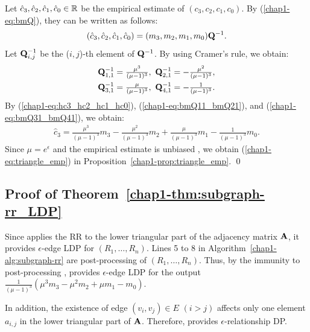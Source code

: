 {Let $\hat{c}_3, \hat{c}_2, \hat{c}_1, \hat{c}_0 \in \mathbb{R}$ be the empirical estimate of $(c_3, c_2, c_1, c_0)$. 
By (\ref{chap1-eq:bmQ}), they can be written as follows:
\begin{align}
(\hat{c}_3, \hat{c}_2, \hat{c}_1, \hat{c}_0) = (m_3, m_2, m_1, m_0) \mathbf{Q}^{-1}.
\label{chap1-eq:hc3_hc2_hc1_hc0}
\end{align}
Let $\mathbf{Q}_{i,j}^{-1}$ be the ($i,j$)-th element of $\mathbf{Q}^{-1}$. 
By using Cramer's rule, we obtain: 
\begin{align}
\mathbf{Q}_{1,1}^{-1} &= \textstyle{\frac{\mu^3}{(\mu-1)^3}},~ \mathbf{Q}_{2,1}^{-1} =  \textstyle{-\frac{\mu^2}{(\mu-1)^3}}, \label{chap1-eq:bmQ11_bmQ21}\\
\mathbf{Q}_{3,1}^{-1} &= \textstyle{\frac{\mu}{(\mu-1)^3}},~ \mathbf{Q}_{4,1}^{-1} = \textstyle{-\frac{1}{(\mu-1)^3}}.
\label{chap1-eq:bmQ31_bmQ41}
\end{align}
By (\ref{chap1-eq:hc3_hc2_hc1_hc0}), (\ref{chap1-eq:bmQ11_bmQ21}), and (\ref{chap1-eq:bmQ31_bmQ41}), we obtain:
\begin{align*}
\textstyle{\hat{c}_3 = \frac{\mu^3}{(\mu-1)^3} m_3 - \frac{\mu^2}{(\mu-1)^3} m_2 + \frac{\mu}{(\mu-1)^3} m_1 - \frac{1}{(\mu-1)^3} m_0.}
\end{align*}
Since $\mu = e^\epsilon$ and the empirical estimate is unbiased \cite{Kairouz_ICML16,Wang_USENIX17}, we obtain (\ref{chap1-eq:triangle_emp}) in Proposition~\ref{chap1-prop:triangle_emp}. \qed

\subsection{Proof of Theorem~\ref{chap1-thm:subgraph-rr_LDP}}
Since  applies the RR to the lower triangular part of the adjacency matrix $\mathbf{A}$, it provides $\epsilon$-edge LDP for $(R_1, \ldots, R_n)$. 
Lines 5 to 8 in Algorithm~\ref{chap1-alg:subgraph-rr} are post-processing of $(R_1, \ldots, R_n)$. 
Thus, by the immunity to post-processing \cite{DP},  provides $\epsilon$-edge LDP for the output $\frac{1}{(\mu-1)^3}(\mu^3 m_3 -\mu^2 m_2 + \mu m_1 - m_0)$. 

In addition, the existence of edge $(v_i,v_j) \in E$ $(i>j)$ affects only one element $a_{i,j}$ in the lower triangular part of $\mathbf{A}$. 
Therefore,  provides $\epsilon$-relationship DP.

}
